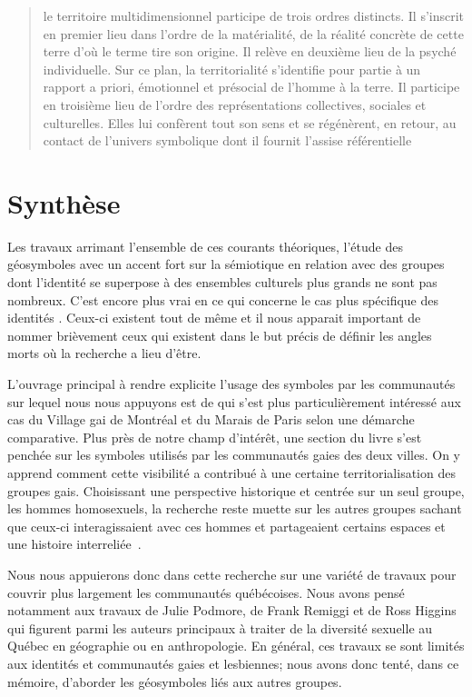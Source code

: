 \blockquote[{\cite[108]{DiMeo1998}}][.]{\textelp{} le territoire multidimensionnel participe de trois ordres distincts. Il s'inscrit en premier lieu dans l'ordre de la matérialité, de la réalité concrète de cette terre d'où le terme tire son origine. Il relève en deuxième lieu de la psyché individuelle.
Sur ce plan, la territorialité s'identifie pour partie à un rapport a priori, émotionnel et présocial de l'homme à la terre. Il participe en troisième lieu de l'ordre des représentations collectives, sociales et culturelles. Elles lui confèrent tout son sens et se régénèrent, en retour, au contact de l'univers symbolique dont il fournit l'assise référentielle}.

\section{Synthèse}
\label{sec:la_diversit_sexuelle_en_g_ographie}
Les travaux arrimant l'ensemble de ces courants théoriques, l'étude des géosymboles avec un accent fort sur la sémiotique en relation avec des groupes dont l'identité se superpose à des ensembles culturels plus grands ne sont pas nombreux.
C'est encore plus vrai en ce qui concerne le cas plus spécifique des identités \lgbt{}.
Ceux-ci existent tout de même et il nous apparait important de nommer brièvement ceux qui existent dans le but précis de définir les angles morts où la recherche a lieu d'être.

L'ouvrage principal à rendre explicite l'usage des symboles par les communautés \lgbt{} sur lequel nous nous appuyons est  de \citet{Giraud2014} qui s'est plus particulièrement intéressé aux cas du Village gai de Montréal et du Marais de Paris selon une démarche comparative.
Plus près de notre champ d'intérêt, une section du livre s'est penchée sur les symboles utilisés par les communautés gaies des deux villes.
On y apprend comment cette visibilité a contribué à une certaine territorialisation des groupes gais.
Choisissant une perspective historique et centrée sur un seul groupe, les hommes homosexuels, la recherche reste muette sur les autres groupes \lgbt{} sachant que ceux-ci interagissaient avec ces hommes et partageaient certains espaces et une histoire interreliée~\citep{Remiggi2000,Demczuk1998,Podmore2001,Higgins1997,Higgins1999}.

Nous nous appuierons donc dans cette recherche sur une variété de travaux pour couvrir plus largement les communautés \lgbt{} québécoises.
Nous avons pensé notamment aux travaux de Julie Podmore, de Frank Remiggi et de Ross Higgins qui figurent parmi les auteurs principaux à traiter de la diversité sexuelle au Québec en géographie ou en anthropologie.
En général, ces travaux se sont limités aux identités et communautés gaies et lesbiennes; nous avons donc tenté, dans ce mémoire, d'aborder les géosymboles liés aux autres groupes.

